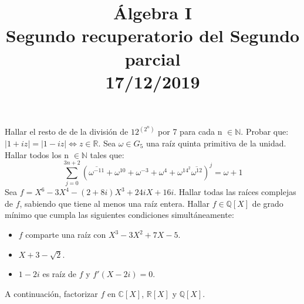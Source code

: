 \documentclass[12pt,twoside,a4paper]{exam}
\title{Álgebra I \\ Segundo recuperatorio del Segundo parcial \\ 17/12/2019}
\begin{document}
\date{}
\maketitle

\begin{questions}

\question Hallar el resto de de la división de  $12^{(2^n)}$ por 7 para cada n $\in\mathbb{N}$.
\question Probar que: $|1+iz|=|1-iz|\iff z \in \mathbb{R}$.
\question Sea $\omega\in G_5$ una raíz quinta primitiva de la unidad. Hallar todos 
          los n $\in \mathbb{N}$ tales que:\\ $$\sum_{j=0}^{3n+2}(\overline{\omega^{-11}}
          +\omega^{10}+\omega^{-3}+\omega^{4}+\omega^{14^2}\overline{\omega^{12}})^j
          =\omega + 1 $$
\question Sea $f=X^6 -3X^4 -(2+8i)X^3+24iX+16i$. Hallar todas las raíces complejas
          de $f$, sabiendo que tiene al menos una raíz entera.
\question Hallar $f\in \mathbb{Q}[X]$ de grado mínimo que cumpla las siguientes
          condiciones simultáneamente:
          \begin{itemize}
          \item $f$ comparte una raíz con $X^3-3X^2+7X-5$.
          \item $X+3-\sqrt{2}$.
          \item $1-2i$ es raíz de $f$ y $f'(X-2i)=0$.
          \end{itemize}
          A continuación, factorizar $f \text{ en } \mathbb{C}[X]$, $\mathbb{R}[X]$
          y $\mathbb{Q}[X]$.
\end{questions}
\end{document}
